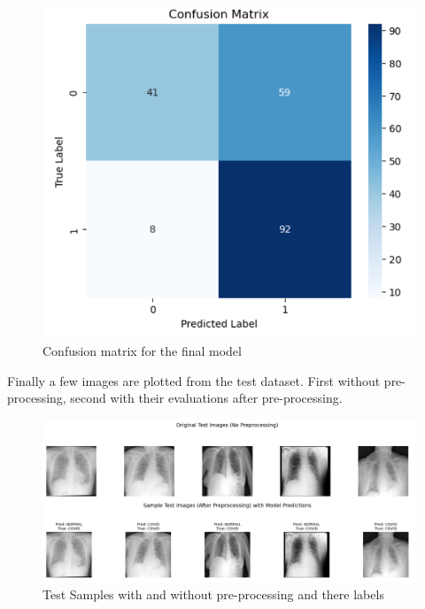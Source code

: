 \documentclass[conference]{IEEEtran}
\begin{document}
\begin{figure}[htbp]
	\centerline{\includegraphics[width=\linewidth]{Images/Transferlearning_3.png}}
	\caption{Confusion matrix for the final model}
	\label{fig:baseline_curves}
\end{figure}



Finally a few images are plotted from the test dataset. First without pre-processing, second with their evaluations after pre-processing.\\	

\begin{figure}[htbp]
	\centerline{\includegraphics[width=\linewidth]{Images/Transferlearning_4.png}}
	\caption{Test Samples with and without pre-processing and there labels}
	\label{fig:baseline_curves}
\end{figure}
\\
\end{document}
